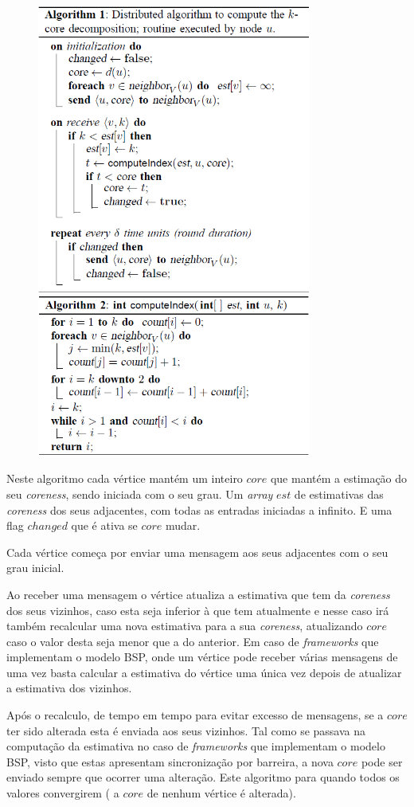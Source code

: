 \documentclass[a4paper,10pt]{report}
\begin{document}
\begin{figure}[ht!]
\includegraphics[width=90mm]{Algorithm1}
\includegraphics[width=90mm]{Algorithm2}
\label{overflow}
\end{figure}

Neste algoritmo cada vértice mantém um inteiro $core$ que mantém a estimação do seu \textit{coreness}, sendo iniciada com o seu grau. Um \textit{array} $est$ de estimativas das \textit{coreness} dos seus adjacentes, com todas as entradas iniciadas a infinito. E uma flag $changed$ que é ativa se $core$ mudar.

Cada vértice começa por enviar uma mensagem aos seus adjacentes com o seu grau inicial. 

Ao receber uma mensagem o vértice atualiza a estimativa que tem da \textit{coreness} dos seus vizinhos, caso esta seja inferior à que tem atualmente e nesse caso irá também recalcular uma nova estimativa para a sua \textit{coreness}, atualizando $core$ caso o valor desta seja menor que a do anterior. Em caso de \textit{frameworks} que implementam o modelo BSP, onde um vértice pode receber várias mensagens de uma vez basta calcular a estimativa do vértice uma única vez depois de atualizar a estimativa dos vizinhos.

Após o recalculo, de tempo em tempo para evitar excesso de mensagens, se a $core$ ter sido alterada esta é enviada aos seus vizinhos. Tal como se passava na computação da estimativa no caso de \textit{frameworks} que implementam o modelo BSP, visto que estas apresentam sincronização por barreira, a nova $core$ pode ser enviado sempre que ocorrer uma alteração. Este algoritmo para quando todos os valores convergirem ( a $core$ de nenhum vértice é alterada).


\end{document}
